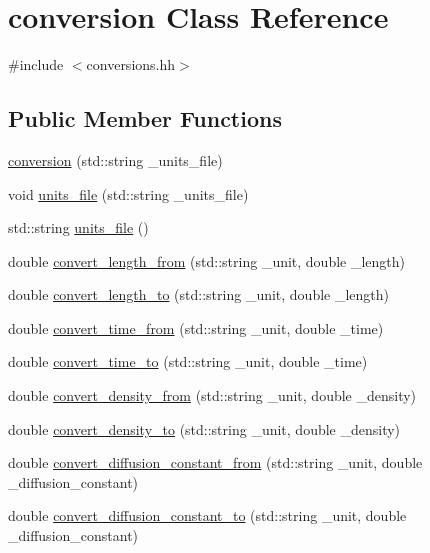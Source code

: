 \hypertarget{classconversion}{\section{conversion Class Reference}
\label{classconversion}
}


{\ttfamily \#include $<$conversions.\-hh$>$}

\subsection*{Public Member Functions}
\begin{DoxyCompactItemize}
\item 
\hyperlink{classconversion_a476633c8abd728e0f4ad33dc2637779e}{conversion} (std\-::string \-\_\-units\-\_\-file)
\item 
void \hyperlink{classconversion_a24e7b3c4129aa5d3b5a924a90dd720e5}{units\-\_\-file} (std\-::string \-\_\-units\-\_\-file)
\item 
std\-::string \hyperlink{classconversion_a579716b0280d6b9143c8eecce177c148}{units\-\_\-file} ()
\item 
double \hyperlink{classconversion_afcc6fb9350429dc5a57f6bbdead32270}{convert\-\_\-length\-\_\-from} (std\-::string \-\_\-unit, double \-\_\-length)
\item 
double \hyperlink{classconversion_a305590a90d39aee8c0e94d923d71d090}{convert\-\_\-length\-\_\-to} (std\-::string \-\_\-unit, double \-\_\-length)
\item 
double \hyperlink{classconversion_a77631560733e6f2f168597a0d0b31f1e}{convert\-\_\-time\-\_\-from} (std\-::string \-\_\-unit, double \-\_\-time)
\item 
double \hyperlink{classconversion_a418c40f9ff27aad72c59fd2d890ccd15}{convert\-\_\-time\-\_\-to} (std\-::string \-\_\-unit, double \-\_\-time)
\item 
double \hyperlink{classconversion_a4d015eb0e19703afeecf61f3bb59e8bb}{convert\-\_\-density\-\_\-from} (std\-::string \-\_\-unit, double \-\_\-density)
\item 
double \hyperlink{classconversion_afea60c71cd3cb678e81cb979aef72477}{convert\-\_\-density\-\_\-to} (std\-::string \-\_\-unit, double \-\_\-density)
\item 
double \hyperlink{classconversion_a11fab44bd149eeda60906aa2a3015712}{convert\-\_\-diffusion\-\_\-constant\-\_\-from} (std\-::string \-\_\-unit, double \-\_\-diffusion\-\_\-constant)
\item 
double \hyperlink{classconversion_aa940aa3ae2480422f6056c46dc0e8cc1}{convert\-\_\-diffusion\-\_\-constant\-\_\-to} (std\-::string \-\_\-unit, double \-\_\-diffusion\-\_\-constant)

\end{DoxyCompactItemize}
